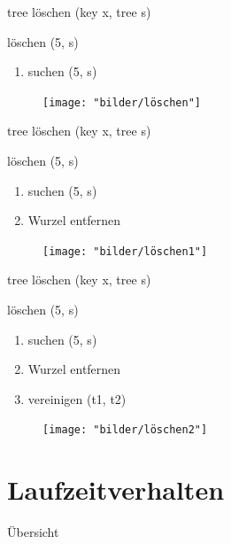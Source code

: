 \documentclass[11pt]{beamer}
\begin{document}
	\begin{frame}{tree löschen (key x, tree s)}
		\begin{block}{löschen (5, s)}
			\begin{enumerate}
				\item suchen (5,  s)
			\end{enumerate}
		\end{block}
	 	\pause	
		\begin{figure}[h]
			\centering
			\texttt{[image: "bilder/löschen"]}	
		\end{figure}	
		
	\end{frame}	


	\begin{frame}{tree löschen (key x, tree s)}
		\begin{block}{löschen (5, s)}
			\begin{enumerate}
				\item suchen (5,  s)
				\item Wurzel entfernen
			\end{enumerate}
		\end{block}
		\begin{figure}[h]
			\centering
			\texttt{[image: "bilder/löschen1"]}	
		\end{figure}	
		
	\end{frame}	

	\begin{frame}{tree löschen (key x, tree s)}
		\begin{block}{löschen (5, s)}
			\begin{enumerate}
				\item suchen (5,  s)
				\item Wurzel entfernen
				\item vereinigen (t1, t2)
			\end{enumerate}
		\end{block}
		\begin{figure}[h]
			\centering
			\texttt{[image: "bilder/löschen2"]}	
		\end{figure}	
	
	\end{frame}	


	\section{Laufzeitverhalten}	
		\begin{frame} {Übersicht}
			\tableofcontents[currentsection]   	
		\end{frame}	
	
\end{document}

